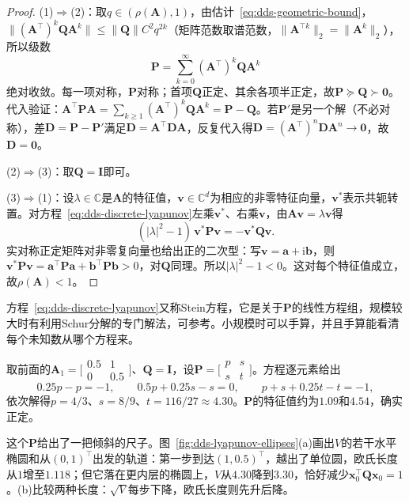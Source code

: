 \begin{proof}
(1)$\Rightarrow$(2)：取$q\in(\rho(\bm A),1)$，由估计~\eqref{eq:dds-geometric-bound}，$\lVert(\bm A^{\top})^k\bm Q\bm A^k\rVert\leq\lVert\bm Q\rVert C^2q^{2k}$（矩阵范数取谱范数，$\lVert\bm A^{\top k}\rVert_2=\lVert\bm A^k\rVert_2$），所以级数
\[
  \bm P=\sum_{k=0}^{\infty}(\bm A^{\top})^k\bm Q\bm A^k
\]
绝对收敛。每一项对称，$\bm P$对称；首项$\bm Q$正定、其余各项半正定，故$\bm P\succeq\bm Q\succ\bm0$。代入验证：$\bm A^{\top}\bm P\bm A=\sum_{k\geq1}(\bm A^{\top})^k\bm Q\bm A^k=\bm P-\bm Q$。若$\bm P'$是另一个解（不必对称），差$\bm D=\bm P-\bm P'$满足$\bm D=\bm A^{\top}\bm D\bm A$，反复代入得$\bm D=(\bm A^{\top})^n\bm D\bm A^n\to\bm0$，故$\bm D=\bm0$。

(2)$\Rightarrow$(3)：取$\bm Q=\bm I$即可。

(3)$\Rightarrow$(1)：设$\lambda\in\mathbb C$是$\bm A$的特征值，$\bm v\in\mathbb C^d$为相应的非零特征向量，$\bm v^*$表示共轭转置。对方程~\eqref{eq:dds-discrete-lyapunov}左乘$\bm v^*$、右乘$\bm v$，由$\bm A\bm v=\lambda\bm v$得
\[
  (|\lambda|^2-1)\,\bm v^*\bm P\bm v=-\bm v^*\bm Q\bm v .
\]
实对称正定矩阵对非零复向量也给出正的二次型：写$\bm v=\bm a+\mathrm i\bm b$，则$\bm v^*\bm P\bm v=\bm a^{\top}\bm P\bm a+\bm b^{\top}\bm P\bm b>0$，对$\bm Q$同理。所以$|\lambda|^2-1<0$。这对每个特征值成立，故$\rho(\bm A)<1$。
\end{proof}

方程~\eqref{eq:dds-discrete-lyapunov}又称Stein方程，它是关于$\bm P$的线性方程组，规模较大时有利用Schur分解的专门解法，可参考。小规模时可以手算，并且手算能看清每个未知数从哪个方程来。

\begin{example}[二阶Stein方程的手算]
\label{ex:dds-stein-by-hand}
取前面的$\bm A_1=\bigl[\begin{smallmatrix}0.5&1\\0&0.5\end{smallmatrix}\bigr]$、$\bm Q=\bm I$，设$\bm P=\bigl[\begin{smallmatrix}p&s\\s&t\end{smallmatrix}\bigr]$。方程逐元素给出
\[
  0.25p-p=-1,\qquad 0.5p+0.25s-s=0,\qquad p+s+0.25t-t=-1,
\]
依次解得$p=4/3$、$s=8/9$、$t=116/27\approx4.30$。$\bm P$的特征值约为$1.09$和$4.54$，确实正定。
\end{example}

这个$\bm P$给出了一把倾斜的尺子。图~\ref{fig:dds-lyapunov-ellipses}(a)画出$V$的若干水平椭圆和从$(0,1)^{\top}$出发的轨道：第一步到达$(1,0.5)^{\top}$，越出了单位圆，欧氏长度从$1$增至$1.118$；但它落在更内层的椭圆上，$V$从$4.30$降到$3.30$，恰好减少$\bm x_0^{\top}\bm Q\bm x_0=1$。(b)比较两种长度：$\sqrt V$每步下降，欧氏长度则先升后降。


